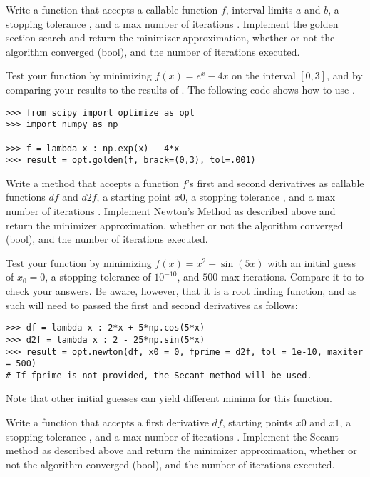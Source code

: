 
Write a function that accepts a callable function $f$, interval limits $a$ and $b$, a stopping tolerance , and a max number of iterations .
Implement the golden section search and return the minimizer approximation, whether or not the algorithm converged (bool), and the number of iterations executed.

Test your function by minimizing $f(x) = e^x - 4x$ on the interval $[0, 3]$, and by comparing your results to the results of .
The following code shows how to use .
 
\begin{lstlisting}
>>> from scipy import optimize as opt
>>> import numpy as np

>>> f = lambda x : np.exp(x) - 4*x
>>> result = opt.golden(f, brack=(0,3), tol=.001)
\end{lstlisting}
\label{prob:golden-section-search}

Write a method that accepts a function $f$'s first and second derivatives as callable functions $df$ and $d2f$, a starting point $x0$, a stopping tolerance , and a max number of iterations .
Implement Newton's Method as described above and return the minimizer approximation, whether or not the algorithm converged (bool), and the number of iterations executed.

Test your function by minimizing $f(x) = x^2 + \sin(5x)$ with an initial guess of $x_0 = 0$, a stopping tolerance of $10^{-10}$, and $500$ max iterations.
Compare it to  to check your answers.
Be aware, however, that it is a root finding function, and as such will need to passed the first and second derivatives as follows:
\begin{lstlisting}
>>> df = lambda x : 2*x + 5*np.cos(5*x)
>>> d2f = lambda x : 2 - 25*np.sin(5*x)
>>> result = opt.newton(df, x0 = 0, fprime = d2f, tol = 1e-10, maxiter = 500)
# If fprime is not provided, the Secant method will be used.
\end{lstlisting}
Note that other initial guesses can yield different minima for this function.

Write a function that accepts a first derivative $df$, starting points $x0$ and $x1$, a stopping tolerance , and a max number of iterations .
Implement the Secant method as described above and return the minimizer approximation, whether or not the algorithm converged (bool), and the number of iterations executed.


